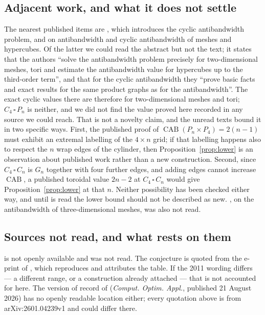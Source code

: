 \documentclass[11pt]{amsart}
\DeclareMathOperator{\CAB}{CAB}
\begin{document}
\subsection*{Adjacent work, and what it does not settle}
The nearest published items are \cite{STV2005}, which introduces the cyclic antibandwidth problem,
and \cite{RSSTV2009} on antibandwidth and cyclic antibandwidth of meshes and hypercubes. Of the
latter we could read the abstract but not the text; it states that the authors ``solve the
antibandwidth problem precisely for two-dimensional meshes, tori and estimate the antibandwidth
value for hypercubes up to the third-order term'', and that for the cyclic antibandwidth they
``prove basic facts and exact results for the same product graphs as for the antibandwidth''. The
exact cyclic values there are therefore for two-dimensional meshes and tori; $C_4\,\square\,P_n$ is
neither, and we did not find the value proved here recorded in any source we could reach. That is
not a novelty claim, and the unread texts bound it in two specific ways. First, the published proof of
$\CAB(P_n\times P_4) = 2(n-1)$ must exhibit an extremal labelling of the $4\times n$ grid; if that
labelling happens also to respect the $n$ wrap edges of the cylinder, then
Proposition~\ref{prop:lower} is an observation about published work rather than a new construction.
Second, since $C_4\,\square\,C_n$ is $G_n$ together with four further edges, and adding edges cannot
increase $\CAB$, a published toroidal value $2n-2$ at $C_4\,\square\,C_n$ would give
Proposition~\ref{prop:lower} at that $n$. Neither possibility has been checked either way, and
until \cite{RSSTV2009} is read the lower bound should not be described as new.
\cite{TorokVrto2010}, on the antibandwidth of three-dimensional meshes, was also not read.

\subsection*{Sources not read, and what rests on them}
\cite{BansalSrivastava} is not openly available and was not read. The conjecture is quoted from the
e-print of \cite{SAT2026}, which reproduces and attributes the table. If the 2011 wording differs
--- a different range, or a construction already attached --- that is not accounted for here. The
version of record of \cite{SAT2026} (\emph{Comput. Optim. Appl.}, published 21 August 2026) has no
openly readable location either; every quotation above is from arXiv:2601.04239v1 and could differ
there.
\end{document}
